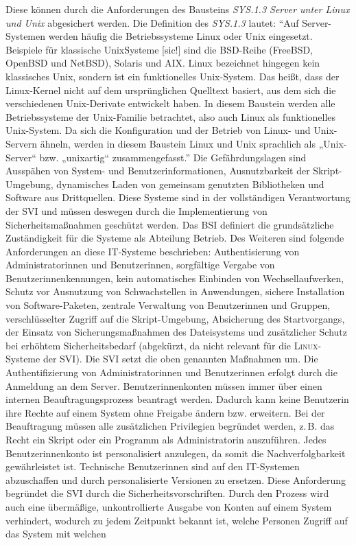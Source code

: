 Diese können durch die Anforderungen des Bausteins \textit{SYS.1.3 Server unter Linux und Unix} abgesichert werden. Die Definition des \textit{SYS.1.3} lautet: \enquote{Auf Server-Systemen werden häufig die Betriebssysteme Linux oder Unix eingesetzt. Beispiele für klassische UnixSysteme [sic!] sind die BSD-Reihe (FreeBSD, OpenBSD und NetBSD), Solaris und AIX. Linux bezeichnet hingegen kein klassisches Unix, sondern ist ein funktionelles Unix-System. Das heißt, dass der Linux-Kernel nicht auf dem ursprünglichen Quelltext basiert, aus dem sich die verschiedenen Unix-Derivate entwickelt haben. In diesem Baustein werden alle Betriebssysteme der Unix-Familie betrachtet, also auch Linux als funktionelles Unix-System. Da sich die	Konfiguration und der Betrieb von Linux- und Unix-Servern ähneln, werden in diesem Baustein Linux und Unix sprachlich als „Unix-Server“ bzw. „unixartig“ zusammengefasst.}\autocite[][S.\,480]{bundesamt_fur_sicherheit_in_der_informationstechnik_bsi_it-grundschutz-kompendium_2020} Die Gefährdungslagen sind Ausspähen von System- und Benutzerinformationen, Ausnutzbarkeit der Skript-Umgebung, dynamisches Laden von gemeinsam genutzten Bibliotheken und Software aus Drittquellen.\autocite[vgl.][S.\,480]{bundesamt_fur_sicherheit_in_der_informationstechnik_bsi_it-grundschutz-kompendium_2020} Diese Systeme sind in der vollständigen Verantwortung der \ac{SVI} und müssen deswegen durch die Implementierung von Sicherheitsmaßnahmen geschützt werden. Das \ac{BSI} definiert die grundsätzliche Zuständigkeit für die Systeme als Abteilung Betrieb. Des Weiteren sind folgende Anforderungen an diese IT-Systeme beschrieben: Authentisierung von Administratorinnen und Benutzerinnen, sorgfältige Vergabe von Benutzerinnenkennungen, kein automatisches Einbinden von Wechsellaufwerken, Schutz vor Ausnutzung von Schwachstellen in Anwendungen, sichere Installation von Software-Paketen, zentrale Verwaltung von Benutzerinnen und Gruppen, verschlüsselter Zugriff auf die Skript-Umgebung, Absicherung des Startvorgangs, der Einsatz von Sicherungsmaßnahmen des Dateisystems und zusätzlicher Schutz bei erhöhtem Sicherheitsbedarf (abgekürzt, da nicht relevant für die \textsc{Linux}-Systeme der \ac{SVI})\autocite[vgl.][S.\,480-482]{bundesamt_fur_sicherheit_in_der_informationstechnik_bsi_it-grundschutz-kompendium_2020}. Die \ac{SVI} setzt die oben genannten Maßnahmen um. Die Authentifizierung von Administratorinnen und Benutzerinnen erfolgt durch die Anmeldung an dem Server. Benutzerinnenkonten müssen immer über einen internen Beauftragungsprozess beantragt werden. Dadurch kann keine Benutzerin ihre Rechte auf einem System ohne Freigabe ändern bzw. erweitern. Bei der Beauftragung müssen alle zusätzlichen Privilegien begründet werden, z.\,B. das Recht ein Skript oder ein Programm als Administratorin auszuführen. Jedes Benutzerinnenkonto ist personalisiert anzulegen, da somit die Nachverfolgbarkeit gewährleistet ist. Technische Benutzerinnen sind auf den IT-Systemen abzuschaffen und durch personalisierte Versionen zu ersetzen. Diese Anforderung begründet die \ac{SVI} durch die Sicherheitsvorschriften. Durch den Prozess wird auch eine übermäßige, unkontrollierte Ausgabe von Konten auf einem System verhindert, wodurch zu jedem Zeitpunkt bekannt ist, welche Personen Zugriff auf das System mit welchen 